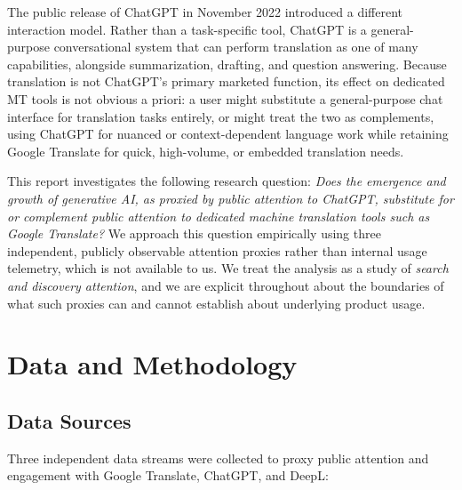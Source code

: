 \documentclass[11pt]{article}
\begin{document}
The public release of ChatGPT in November 2022 introduced a different interaction model. Rather than a task-specific tool, ChatGPT is a general-purpose conversational system that can perform translation as one of many capabilities, alongside summarization, drafting, and question answering. Because translation is not ChatGPT's primary marketed function, its effect on dedicated MT tools is not obvious a priori: a user might substitute a general-purpose chat interface for translation tasks entirely, or might treat the two as complements, using ChatGPT for nuanced or context-dependent language work while retaining Google Translate for quick, high-volume, or embedded translation needs.

This report investigates the following research question: \textit{Does the emergence and growth of generative AI, as proxied by public attention to ChatGPT, substitute for or complement public attention to dedicated machine translation tools such as Google Translate?} We approach this question empirically using three independent, publicly observable attention proxies rather than internal usage telemetry, which is not available to us. We treat the analysis as a study of \emph{search and discovery attention}, and we are explicit throughout about the boundaries of what such proxies can and cannot establish about underlying product usage.

\section{Data and Methodology}

\subsection{Data Sources}

Three independent data streams were collected to proxy public attention and engagement with Google Translate, ChatGPT, and DeepL:
\end{document}
